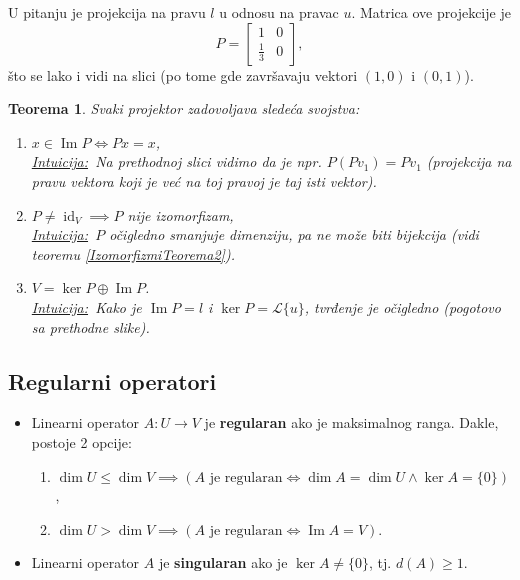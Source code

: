 \documentclass[a4paper,12pt,twoside]{report}
\newtheorem{theorem}{Teorema}[section]
\numberwithin{algorithm}{section}
\newcommand{\intuicija}{\noindent\underline{\textit{Intuicija:}}\ }
\begin{document}
    \noindent U pitanju je projekcija na pravu $l$ u odnosu na pravac $u$. Matrica ove projekcije je 
    \[ P = \begin{bmatrix}
        1 & 0 \\[6pt]
        \frac{1}{3} & 0
    \end{bmatrix}, \]
    što se lako i vidi na slici (po tome gde završavaju vektori $(1, 0)$ i $(0, 1)$).

\begin{theorem}
    Svaki projektor zadovoljava sledeća svojstva:
    \begin{enumerate}
        \item $x \in \operatorname{Im} P \iff Px = x$,\\
        \intuicija Na prethodnoj slici vidimo da je npr. $P(Pv_1) = Pv_1$ (projekcija na pravu vektora koji je već na toj 
        pravoj je taj isti vektor).
        \item $P \neq \operatorname{id}_V \implies P$ nije izomorfizam,\\
        \intuicija $P$ očigledno smanjuje dimenziju, pa ne može biti bijekcija (vidi teoremu \ref{IzomorfizmiTeorema2}).
        \item $V = \ker P \oplus \operatorname{Im} P$.\\
        \intuicija Kako je $\operatorname{Im} P = l$ i $\ker P = \mathcal{L}\{u\}$, tvrđenje je očigledno (pogotovo sa prethodne slike).
    \end{enumerate}
\end{theorem}
\newpage

\subsection{Regularni operatori}

\begin{itemize}
    \item Linearni operator $A:U \to V$ je \textbf{regularan} ako je maksimalnog ranga. Dakle, postoje 2 opcije:
    \begin{enumerate}
        \item $\dim U \leq \dim V \implies (A \text{ je regularan} \iff \dim A = \dim U \land \ker A = \{0\})$,
        \item $\dim U > \dim V \implies (A \text{ je regularan} \iff \operatorname{Im} A = V)$.
    \end{enumerate}
    \item Linearni operator $A$ je \textbf{singularan} ako je $\ker A \neq \{0\}$, tj. $d(A) \geq 1$.
\end{itemize}
\end{document}
